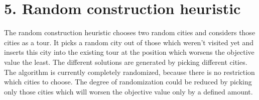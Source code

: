 \section*{5. Random construction heuristic}
The random construction heuristic chooses two random cities and considers those cities as a tour. It picks a random city out of those which weren't visited yet and inserts this city into the existing tour at the position which worsens the objective value the least. The different solutions are generated by picking different cities. The algorithm is currently completely randomized, because there is no restriction which cities to choose. The degree of randomization could be reduced by picking only those cities which will worsen the objective value only by a defined amount.
